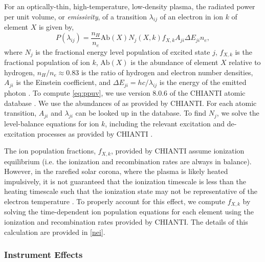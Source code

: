 For an optically-thin, high-temperature, low-density plasma, the radiated power per unit volume, or \textit{emissivity}, of a transition $\lambda_{ij}$ of an electron in ion $k$ of element $X$ is given by,
\begin{equation}
    \label{eq:ppuv}
    P(\lambda_{ij}) = \frac{n_H}{n_e}\mathrm{Ab}(X)N_j(X,k)f_{X,k}A_{ji}\Delta E_{ji}n_e,
\end{equation}
where $N_j$ is the fractional energy level population of excited state $j$, $f_{X,k}$ is the fractional population of ion $k$, $\mathrm{Ab}(X)$ is the abundance of element $X$ relative to hydrogen, $n_H/n_e\approx0.83$ is the ratio of hydrogen and electron number densities, $A_{ji}$ is the Einstein coefficient, and $\Delta E_{ji}=hc/\lambda_{ij}$ is the energy of the emitted photon \citep[see][]{mason_spectroscopic_1994,del_zanna_solar_2018}. To compute \autoref{eq:ppuv}, we use version 8.0.6 of the CHIANTI atomic database \citep{dere_chianti_1997,young_chianti_2016}. We use the abundances of \citet{feldman_potential_1992} as provided by CHIANTI. For each atomic transition, $A_{ji}$ and $\lambda_{ji}$ can be looked up in the database. To find $N_j$, we solve the level-balance equations for ion $k$, including the relevant excitation and de-excitation processes as provided by CHIANTI \citep[see section 3.3 of][]{del_zanna_solar_2018}.

The ion population fractions, $f_{X,k}$, provided by CHIANTI assume ionization equilibrium (i.e. the ionization and recombination rates are always in balance). However, in the rarefied solar corona, where the plasma is likely heated impulsively, it is not guaranteed that the ionization timescale is less than the heating timescale such that the ionization state may not be representative of the electron temperature \citep{bradshaw_explosive_2006,reale_nonequilibrium_2008,bradshaw_numerical_2009}. To properly account for this effect, we compute $f_{X,k}$ by solving the time-dependent ion population equations for each element using the ionization and recombination rates provided by CHIANTI. The details of this calculation are provided in \autoref{nei}.

\subsubsection{Instrument Effects}\label{instrument}

